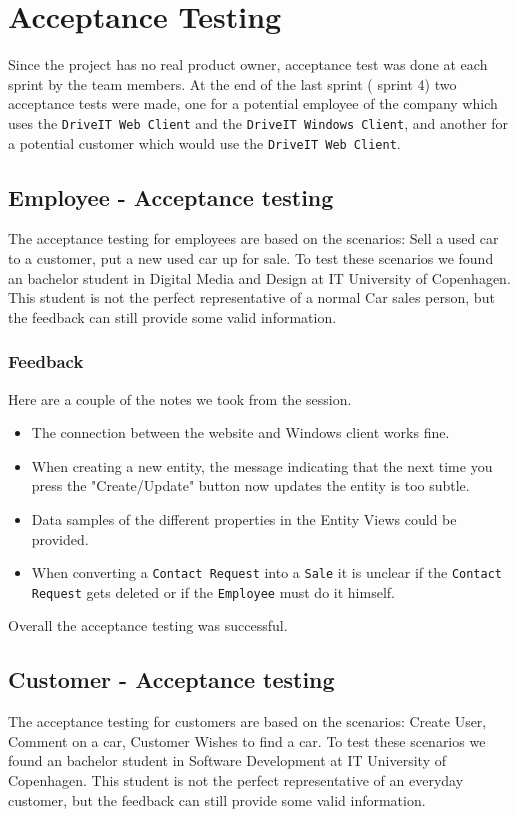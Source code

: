 \section{Acceptance Testing}
Since the project has no real product owner, acceptance test was done at each sprint by the team members. At the end of the last sprint ( sprint 4) two acceptance tests were made, one for a potential employee of the company which uses the \texttt{DriveIT Web Client} and the \texttt{DriveIT Windows Client}, and another for a potential customer which would use the \texttt{DriveIT Web Client}.
\subsection{Employee - Acceptance testing}
The acceptance testing for employees are based on the scenarios:  Sell a used car to a customer, put a new used car up for sale. To test these scenarios we found an bachelor student in Digital Media and Design at IT University of Copenhagen. This student is not the perfect representative of a normal Car sales person, but the feedback can still provide some valid information.
\subsubsection{Feedback}
Here are a couple of the notes we took from the session.
\begin{itemize}
	\item The connection between the website and Windows client works fine.
	\item When creating a new entity, the message indicating that the next time you press the "Create/Update" button now updates the entity is too subtle.
	\item Data samples of the different properties in the Entity Views could be provided.
	\item When converting a \texttt{Contact Request} into a \texttt{Sale} it is unclear if the \texttt{Contact Request} gets deleted or if the \texttt{Employee} must do it himself.
\end{itemize}
Overall the acceptance testing was successful.
\subsection{Customer - Acceptance testing}
The acceptance testing for customers are based on the scenarios:  Create User, Comment on a car, Customer Wishes to find a car. To test these scenarios we found an bachelor student in Software Development at IT University of Copenhagen. This student is not the perfect representative of an everyday customer, but the feedback can still provide some valid information.
